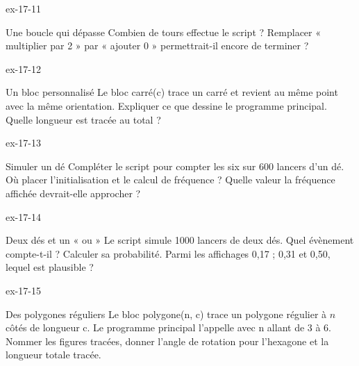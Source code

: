 \clearpage{}
\begin{blocLivre}{ex-17-11}\begin{exercice}[3]{Une boucle qui dépasse}
Combien de tours effectue le script ? Remplacer « multiplier par 2 » par « ajouter 0 » permettrait-il encore de terminer ?
\label{fig-ex-17-11}
\end{exercice}\end{blocLivre}
\begin{blocLivre}{ex-17-12}\begin{exercice}[3]{Un bloc personnalisé}
Le bloc carré(c) trace un carré et revient au même point avec la même orientation. Expliquer ce que dessine le programme principal. Quelle longueur est tracée au total ?
\label{fig-ex-17-12}
\end{exercice}\end{blocLivre}
\begin{blocLivre}{ex-17-13}\begin{exercice}[3]{Simuler un dé}
Compléter le script pour compter les six sur 600 lancers d’un dé. Où placer l’initialisation et le calcul de fréquence ? Quelle valeur la fréquence affichée devrait-elle approcher ?
\label{fig-ex-17-13}
\end{exercice}\end{blocLivre}
\begin{blocLivre}{ex-17-14}\begin{exercice}[3]{Deux dés et un « ou »}
Le script simule 1000 lancers de deux dés. Quel évènement compte-t-il ? Calculer sa probabilité. Parmi les affichages 0,17 ; 0,31 et 0,50, lequel est plausible ?
\label{fig-ex-17-14}
\end{exercice}\end{blocLivre}
\begin{blocLivre}{ex-17-15}\begin{exercice}[3]{Des polygones réguliers}
Le bloc polygone(n, c) trace un polygone régulier à $n$ côtés de longueur c. Le programme principal l’appelle avec n allant de 3 à 6. Nommer les figures tracées, donner l’angle de rotation pour l’hexagone et la longueur totale tracée.
\label{fig-ex-17-15}
\end{exercice}\end{blocLivre}

\clearpage
